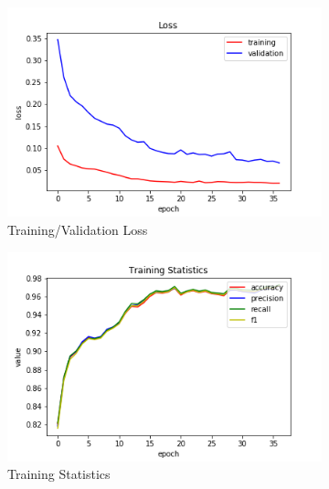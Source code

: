 \begin{figure}[h!]
  \centerfloat
  \begin{subfigure}[b]{0.35\linewidth}
    \includegraphics[width=\linewidth]{images/cae_online_lstm/caelstm_section_lstm_training_uniform_random_fill_10000_block_map_10000_model_loss.png}
     \caption{Training/Validation Loss}
  \end{subfigure}
  \hfill
  \begin{subfigure}[b]{0.35\linewidth}
    \includegraphics[width=\linewidth]{images/cae_online_lstm/caelstm_section_lstm_training_uniform_random_fill_10000_block_map_10000_model_training_stats.png}
     \caption{Training Statistics}
  \end{subfigure}
  \hfill
  \begin{subfigure}[b]{0.35\linewidth}

\end{subfigure}
\end{figure}
